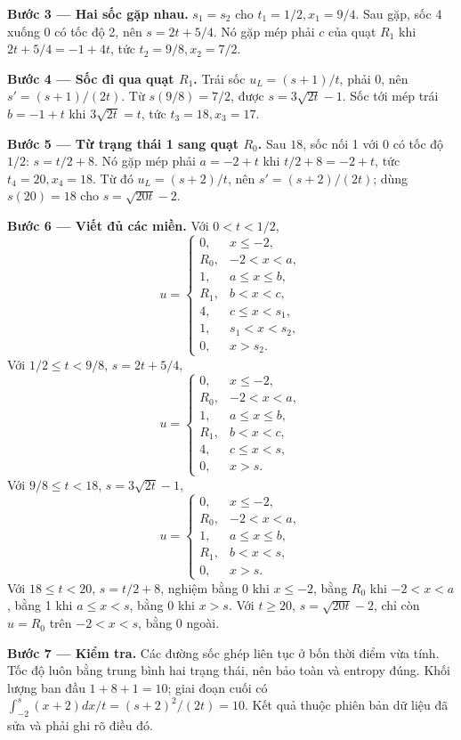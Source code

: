 \textbf{Bước 3 — Hai sốc gặp nhau.} $s_1=s_2$ cho $t_1=1/2,x_1=9/4$. Sau gặp, sốc 4 xuống 0 có tốc độ 2, nên $s=2t+5/4$. Nó gặp mép phải $c$ của quạt $R_1$ khi $2t+5/4=-1+4t$, tức $t_2=9/8,x_2=7/2$.

\textbf{Bước 4 — Sốc đi qua quạt $R_1$.} Trái sốc $u_L=(s+1)/t$, phải 0, nên $s'=(s+1)/(2t)$. Từ $s(9/8)=7/2$, được $s=3\sqrt{2t}-1$. Sốc tới mép trái $b=-1+t$ khi $3\sqrt{2t}=t$, tức $t_3=18,x_3=17$.

\textbf{Bước 5 — Từ trạng thái 1 sang quạt $R_0$.} Sau $18$, sốc nối 1 với 0 có tốc độ $1/2$: $s=t/2+8$. Nó gặp mép phải $a=-2+t$ khi $t/2+8=-2+t$, tức $t_4=20,x_4=18$. Từ đó $u_L=(s+2)/t$, nên $s'=(s+2)/(2t)$; dùng $s(20)=18$ cho $s=\sqrt{20t}-2$.

\textbf{Bước 6 — Viết đủ các miền.} Với $0<t<1/2$,
\[u=\begin{cases}0,&x\le-2,\\R_0,&-2<x<a,\\1,&a\le x\le b,\\R_1,&b<x<c,\\4,&c\le x<s_1,\\1,&s_1<x<s_2,\\0,&x>s_2.\end{cases}\]
Với $1/2\le t<9/8$, $s=2t+5/4$,
\[u=\begin{cases}0,&x\le-2,\\R_0,&-2<x<a,\\1,&a\le x\le b,\\R_1,&b<x<c,\\4,&c\le x<s,\\0,&x>s.\end{cases}\]
Với $9/8\le t<18$, $s=3\sqrt{2t}-1$,
\[u=\begin{cases}0,&x\le-2,\\R_0,&-2<x<a,\\1,&a\le x\le b,\\R_1,&b<x<s,\\0,&x>s.\end{cases}\]
Với $18\le t<20$, $s=t/2+8$, nghiệm bằng 0 khi $x\le-2$, bằng $R_0$ khi $-2<x<a$, bằng 1 khi $a\le x<s$, bằng 0 khi $x>s$. Với $t\ge20$, $s=\sqrt{20t}-2$, chỉ còn $u=R_0$ trên $-2<x<s$, bằng 0 ngoài.

\textbf{Bước 7 — Kiểm tra.} Các đường sốc ghép liên tục ở bốn thời điểm vừa tính. Tốc độ luôn bằng trung bình hai trạng thái, nên bảo toàn và entropy đúng. Khối lượng ban đầu $1+8+1=10$; giai đoạn cuối có $\int_{-2}^s(x+2)dx/t=(s+2)^2/(2t)=10$. Kết quả thuộc phiên bản dữ liệu đã sửa và phải ghi rõ điều đó.

